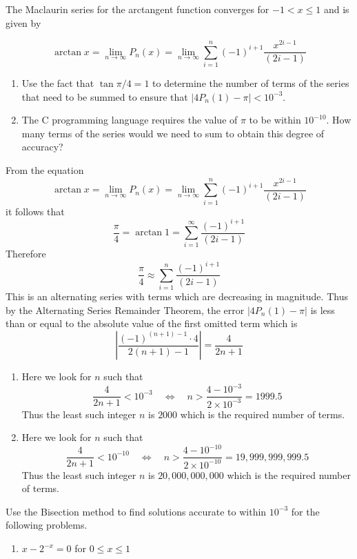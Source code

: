\begin{posttest}
\begin{mysolution}
\end{mysolution}
\item The Maclaurin series for the arctangent function converges for $-1<x \leq 1$ and is given by

$$
\arctan x=\lim _{n \rightarrow \infty} P_{n}(x)=\lim _{n \rightarrow \infty} \sum_{i=1}^{n}(-1)^{i+1} \frac{x^{2 i-1}}{(2 i-1)}
$$

\begin{enumerate}[label=(\alph*)]
\item Use the fact that $\tan \pi / 4=1$ to determine the number of terms of the series that need to be summed to ensure that $\left|4 P_{n}(1)-\pi\right|<10^{-3}$.
\item The C programming language requires the value of $\pi$ to be within $10^{-10}$. How many terms of the series would we need to sum to obtain this degree of accuracy?
\end{enumerate}
\begin{mysolution}
From the equation
\[\arctan x=\lim _{n \rightarrow \infty} P_{n}(x)=\lim _{n \rightarrow \infty} \sum_{i=1}^{n}(-1)^{i+1} \frac{x^{2 i-1}}{(2 i-1)}\]
it follows that 
\[\frac{\pi}{4}=\arctan 1=\sum_{i=1}^{\infty}\frac{(-1)^{i+1}}{(2 i-1)}\]
Therefore
\[\frac{\pi}{4}\approx\sum_{i=1}^{n}\frac{(-1)^{i+1}}{(2 i-1)}\]
This is an alternating series with terms which are decreasing in magnitude. Thus by the Alternating Series Remainder Theorem, the error $|4P_n(1)-\pi|$ is less than or equal to the absolute value of the first omitted term which is
\[\left|\frac{(-1)^{(n+1)-1}\cdot 4}{2(n+1)-1}\right|=\frac{4}{2n+1}\]
\begin{enumerate}[label=(\alph*)]
\item Here we look for $n$ such that
\[\frac{4}{2n+1}<10^{-3}\quad\Longleftrightarrow\quad n>\frac{4-10^{-3}}{2\times10^{-3}}=1999.5\]
Thus the least such integer $n$ is $2000$ which is the required number of terms.
\item Here we look for $n$ such that
\[\frac{4}{2n+1}<10^{-10}\quad\Longleftrightarrow\quad n>\frac{4-10^{-10}}{2\times10^{-10}}=19,999,999,999.5\]
Thus the least such integer $n$ is $20,000,000,000$ which is the required number of terms.
\end{enumerate}
\end{mysolution}
\item Use the Bisection method to find solutions accurate to within $10^{-3}$ for the following problems.
\begin{enumerate}[label=(\alph*)]
\item $x-2^{-x}=0$ for $0\leq x\leq1$

\end{enumerate}
\end{posttest}
